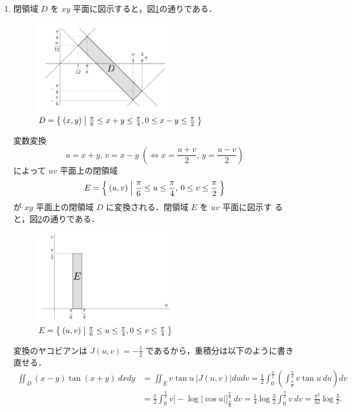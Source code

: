 \documentclass[11pt, uplatex, dvipdfmx]{jsarticle}
\begin{document}
\begin{enumerate}[(1)]
   \item 閉領域 $D$ を $xy$ 平面に図示すると，図\ref{fig:no9}の通りである．
     \begin{figure}[h]
       \centering
       \includegraphics[height=4cm]{./pictures/no9.pdf}
       \caption{$D=\Set{ (x,y) | \frac{\pi}{6} \leq x +y \leq \frac{\pi}{4}, 
           0 \leq x-y \leq \frac{\pi}{2} }$}\label{fig:no9}          
     \end{figure}

     変数変換
     \[
       u=x+y, \, v=x-y \; \left( \Leftrightarrow x=\frac{u+v}{2}, \, y=\frac{u-v}{2} \right)
     \]
     によって $uv$ 平面上の閉領域
     \[
       E=\Set{ (u,v)  |  \frac{\pi}{6} \leq u \leq \frac{\pi}{4}, \, 0 \leq v \leq \frac{\pi}{2} }
     \]
     が $xy$ 平面上の閉領域 $D$ に変換される．閉領域 $E$ を $uv$ 平面に図示す
     ると，図\ref{fig:no9uv}の通りである．
     \begin{figure}[h]
       \centering
       \includegraphics[height=4cm]{./pictures/no9uv.pdf}
       \caption{$E=\Set{(u,v) | \frac{\pi}{6} \leq u \leq \frac{\pi}{4}, 
           0 \leq v \leq \frac{\pi}{4} }$}\label{fig:no9uv}
     \end{figure}
 
     変換のヤコビアンは $J(u,v)=-\frac{1}{2}$ であるから，重積分は以下のように書き直せる．
     \begin{align*}
         \iint_D (x-y)\tan(x+y) \ dx dy 
       &= \iint_E v \tan u \ |J(u,v)| du dv
         = \frac{1}{2}\int_{0}^{\frac{\pi}{2}} 
         \left( \int_{\frac{\pi}{6}}^{\frac{\pi}{4}} v \tan u \ du \right) dv\\
       &= \frac{1}{2} \int_{0}^{\frac{\pi}{2}} v\Big[ -\log | \cos u |
         \Big]_{\frac{\pi}{6}}^{\frac{\pi}{4}} \ dv = \frac{1}{4}\log
         \frac{3}{2} \int_{0}^{\frac{\pi}{2}} v \ dv = \frac{\pi^2}{32}\log \frac{3}{2}.
     \end{align*}



\end{enumerate}
\end{document}
